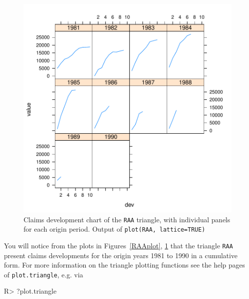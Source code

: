 \documentclass{article}
\begin{document}
\begin{figure}
  \centering
\includegraphics{ChainLadder-TrianglePlot2}
\caption{Claims development chart of the \texttt{RAA} triangle, with
  individual panels for each origin period. Output of
  \texttt{plot(RAA, lattice=TRUE)}
  }
\label{RAAplot2}
\end{figure}

You will notice from the plots in Figures~\ref{RAAplot},
\ref{RAAplot2}  that the triangle \texttt{RAA} present claims
developments for  the origin years 1981 to 1990 in a cumulative form.
For more information on the triangle plotting functions see the help
pages of \texttt{plot.triangle}, e.g. via
\begin{Schunk}
\begin{Sinput}
R> ?plot.triangle
\end{Sinput}
\end{Schunk}
\end{document}

